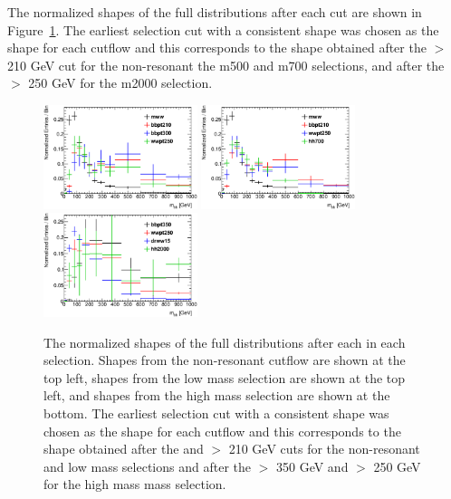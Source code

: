 The normalized shapes of the full \mbb distributions after each 
cut are shown in Figure~\ref{fig:mbbShapes}. The earliest selection cut with a consistent shape was chosen as the
shape for each cutflow and this corresponds to the shape obtained
after the  \ptbb $>$ 210 GeV cut 
for the non-resonant the m500 and m700  selections,  and after the  \ptww $>$ 250 GeV for the m2000 selection.

\begin{figure}[h!]
\begin{center}
\includegraphics[width=0.4\textwidth]{figures/multijet/reOptNonRes_mbbShape_individualCuts_elmu}
\includegraphics[width=0.4\textwidth]{figures/multijet/reOpt700_mbbShape_individualCuts_elmu}
\includegraphics[width=0.4\textwidth]{figures/multijet/reOpt2000_mbbShape_individualCuts_elmu}
\end{center}

\caption{The normalized shapes of the full \mbb distributions after
  each in each selection. Shapes from the non-resonant cutflow are
  shown at the top left, shapes from the low mass selection are shown
  at the top left, and shapes from the high mass selection are shown
  at the bottom. The earliest selection cut with a consistent shape
  was chosen as the shape for each cutflow and this corresponds to the
  shape obtained after the \mww and \ptbb $>$ 210 GeV cuts for the
  non-resonant and low mass selections and after the \ptbb $>$ 350 GeV
  and \ptww $>$ 250 GeV for the high mass mass selection.} \label{fig:mbbShapes}
\end{figure}

